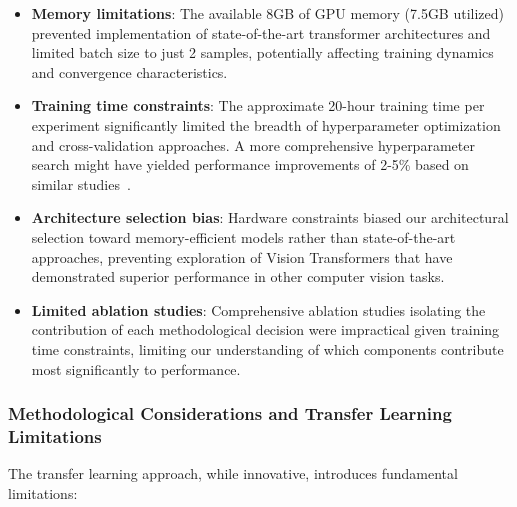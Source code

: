\documentclass[12pt, a4paper]{article}
\begin{document}
\begin{itemize}
    \item \textbf{Memory limitations}: The available 8GB of GPU memory (7.5GB utilized) prevented implementation of state-of-the-art transformer architectures and limited batch size to just 2 samples, potentially affecting training dynamics and convergence characteristics.
    
    \item \textbf{Training time constraints}: The approximate 20-hour training time per experiment significantly limited the breadth of hyperparameter optimization and cross-validation approaches. A more comprehensive hyperparameter search might have yielded performance improvements of 2-5\% based on similar studies~\cite{wen2020convolutional}.
    
    \item \textbf{Architecture selection bias}: Hardware constraints biased our architectural selection toward memory-efficient models rather than state-of-the-art approaches, preventing exploration of Vision Transformers that have demonstrated superior performance in other computer vision tasks.
    
    \item \textbf{Limited ablation studies}: Comprehensive ablation studies isolating the contribution of each methodological decision were impractical given training time constraints, limiting our understanding of which components contribute most significantly to performance.
\end{itemize}

\subsubsection{Methodological Considerations and Transfer Learning Limitations}

The transfer learning approach, while innovative, introduces fundamental limitations:
\end{document}
